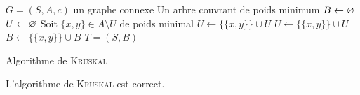 \begin{algorithm}[H]
	\centering
	\begin{algorithmic}[1]
		\Entree $G = (S, A, c)$\/ un graphe connexe
		\Sortie Un arbre couvrant de poids minimum
		\State $B \gets \varnothing$\/ 
		\State $U \gets \varnothing$\/
			\State Soit $\{x,y\} \in A \setminus U$\/ de poids minimal
				\State $U \gets \big\{\!\{x,y\}\!\big\} \cup U$
			\Else
				\State $U \gets \big\{\!\{x,y\}\!\big\} \cup U$
				\State $B \gets \big\{\!\{x,y\}\!\big\} \cup B$
			\EndIf
		\EndWhile
		\State\Return $T = (S,B)$\/
	\end{algorithmic}
	\caption{Algorithme de \textsc{Kruskal}}
\end{algorithm}

\begin{prop}
	L'algorithme de \textsc{Kruskal} est correct.
\end{prop}

